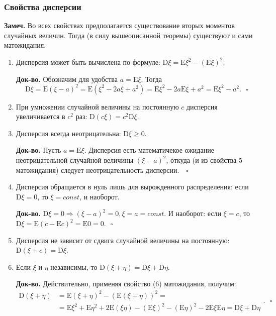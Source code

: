 \documentclass[oneside,final,14pt]{extreport}
\newcommand\mynote{{\bf Замеч.}}
\newcommand\myqed{{\bf Док-во.}}
\theoremstyle{definition}
\begin{document}
\subsubsection{Свойства дисперсии}

\mynote{} Во всех свойствах предполагается существование вторых моментов случайных величин. Тогда (в силу вышеописанной теоремы) существуют и сами матожидания.

\begin{enumerate}
    \item Дисперсия может быть вычислена по формуле: $\mathrm{D}\xi = \mathrm{E}\xi^2 - (\mathrm{E}\xi)^2$.
    
    \myqed{} Обозначим для удобства $a = \mathrm{E}\xi.$ Тогда
    $$\mathrm{D} \xi=\mathrm{E}(\xi-a)^{2}=\mathrm{E}\left(\xi^{2}-2 a \xi+a^{2}\right)=\mathrm{E} \xi^{2}-2 a \mathrm{E} \xi+a^{2}=\mathrm{E} \xi^{2}-a^{2}. ~~~ \square$$
    
    \item При умножении случайной величины на постоянную $c$ дисперсия увеличивается в $c^2$ раз: $\mathrm{D}(c\xi) = c^2\mathrm{D}\xi.$
    \item Дисперсия всегда неотрицательна: $\mathrm{D}\xi \geq 0.$
    
    \myqed{} Пусть $a = \mathrm{E}\xi.$ Дисперсия есть математичекое ожидание неотрицательной случайной величины $(\xi - a)^2$, откуда (и из свойства 5 матожидания) следует неотрицательность дисперсии. $ ~~~ \square$
    
    \item Дисперсия обращается в нуль лишь для вырожденного распределения: если $\mathrm{D}\xi = 0$, то $\xi = const$, и наоборот.
    
    \myqed{} $\mathrm{D}\xi = 0 \Rightarrow (\xi - a)^2 = 0, \xi = a = const.$ И наоборот: если $\xi = c$, то $\mathrm{D} \xi=\mathrm{E}(c-\mathrm{E} c)^{2}=\mathrm{E} 0=0. ~~~ \square$
    
    \item Дисперсия не зависит от сдвига случайной величины на постоянную: $\mathrm{D}(\xi + c) = \mathrm{D}\xi.$
    
    \item Если $\xi$ и $\eta$ независимы, то $\mathrm{D}(\xi + \eta) = \mathrm{D}\xi + \mathrm{D}\eta.$
    
    \myqed{} Действительно, применяя свойство (6) матожидания, получим:
    $$\begin{aligned}
    \mathrm{D}(\xi+\eta) &=\mathrm{E}(\xi+\eta)^{2}-(\mathrm{E}(\xi+\eta))^{2}=\\
    &=\mathrm{E} \xi^{2}+\mathrm{E} \eta^{2}+2 \mathrm{E}(\xi \eta)-(\mathrm{E} \xi)^{2}-(\mathrm{E} \eta)^{2}-2 \mathrm{E} \xi \mathrm{E} \eta=\mathrm{D} \xi+\mathrm{D} \eta
    \end{aligned}. ~~~ \square$$
    

\end{enumerate}
\end{document}
